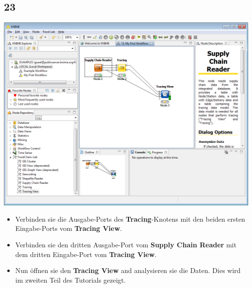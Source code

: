 \documentclass{beamer}
\begin{document}
\subsection{23}
\begin{frame}
	\begin{center}
  		\includegraphics[height=0.5\textheight]{23.png}
	\end{center}
	\begin{itemize}
		\item Verbinden sie die Ausgabe-Ports des \textbf{Tracing}-Knotens mit den beiden ersten Eingabe-Ports vom \textbf{Tracing View}.
		\item Verbinden sie den dritten Ausgabe-Port vom \textbf{Supply Chain Reader} mit dem dritten Eingabe-Port vom \textbf{Tracing View}.
		\item Nun öffnen sie den \textbf{Tracing View} and analysieren sie die Daten. Dies wird im zweiten Teil des Tutorials gezeigt.
	\end{itemize}
\end{frame}
\end{document}
